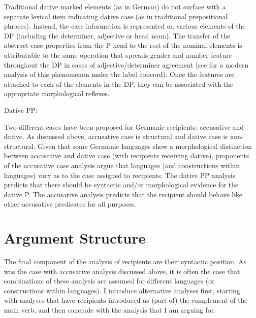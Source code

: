 Traditional dative marked elements (as in German) do not surface with a separate lexical item indicating dative case (as in traditional prepositional phrases). Instead, the case information is represented on various elements of the DP (including the determiner, adjective or head noun). The transfer of the abstract case properties from the P head to the rest of the nominal elements is attributable to the same operation that spreads gender and number feature throughout the DP in cases of adjective/determiner agreement (see \citealt{Norris.2012} for a modern analysis of this phenomenon under the label concord). Once the features are attached to each of the elements in the DP, they can be associated with the appropriate morphological reflexes.

\begin{exe}
\ex Dative PP: \\
\end{exe}

Two different cases have been proposed for Germanic recipients: accusative and dative. As discussed above, accusative case is structural and dative case is non-structural. Given that some Germanic languages show a morphological distinction between accusative and dative case (with recipients receiving dative), proponents of the accusative case analysis argue that languages (and constructions within languages) vary as to the case assigned to recipients. The dative PP analysis predicts that there should be syntactic and/or morphological evidence for the dative P. The accusative analysis predicts that the recipient should behave like other accusative predicates for all purposes.

\section{Argument Structure}
The final component of the analysis of recipients are their syntactic position. As was the case with accusative analysis discussed above, it is often the case that combinations of these analysis are assumed for different languages (or constructions within languages). I introduce alternative analyses first, starting with analyses that have recipients introduced as (part of) the complement of the main verb, and then conclude with the analysis that I am arguing for.

